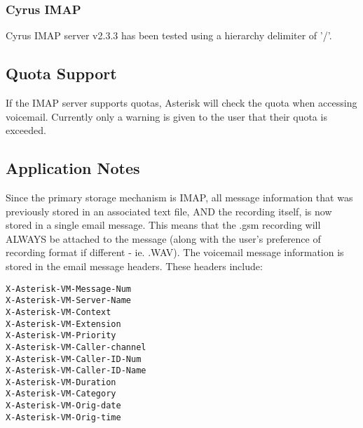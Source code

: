 \subsubsection{Cyrus IMAP}

Cyrus IMAP server v2.3.3 has been tested using a hierarchy delimiter of '/'.


\subsection{Quota Support}

If the IMAP server supports quotas, Asterisk will check the quota when
accessing voicemail.  Currently only a warning is given to the user that
their quota is exceeded.


\subsection{Application Notes}

Since the primary storage mechanism is IMAP, all message information that
was previously stored in an associated text file, AND the recording itself,
is now stored in a single email message.  This means that the .gsm recording
will ALWAYS be attached to the message (along with the user's preference of
recording format if different - ie. .WAV).  The voicemail message information
is stored in the email message headers.  These headers include:

\begin{verbatim}
X-Asterisk-VM-Message-Num
X-Asterisk-VM-Server-Name
X-Asterisk-VM-Context
X-Asterisk-VM-Extension
X-Asterisk-VM-Priority
X-Asterisk-VM-Caller-channel
X-Asterisk-VM-Caller-ID-Num
X-Asterisk-VM-Caller-ID-Name
X-Asterisk-VM-Duration
X-Asterisk-VM-Category
X-Asterisk-VM-Orig-date
X-Asterisk-VM-Orig-time
\end{verbatim}
